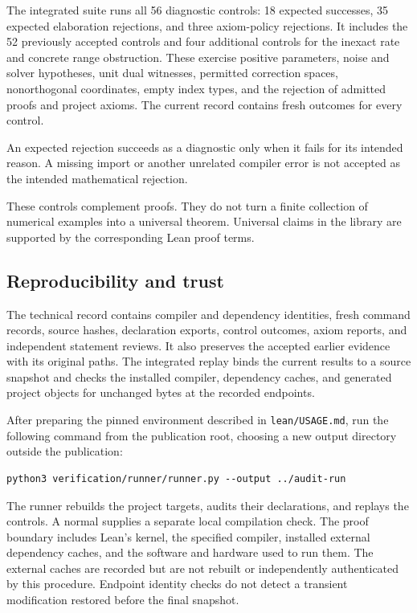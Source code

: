 \documentclass[11pt]{article}
\newcommand{\leanname}[1]{{\small\ttfamily\nolinkurl{#1}}}
\newcommand{\leanexpr}[1]{{\small\code{#1}}}
\begin{document}
The integrated suite runs all 56 diagnostic controls: 18 expected successes, 35 expected elaboration rejections, and three axiom-policy rejections. It includes the 52 previously accepted controls and four additional controls for the inexact rate and concrete range obstruction. These exercise positive parameters, noise and solver hypotheses, unit dual witnesses, permitted correction spaces, nonorthogonal coordinates, empty index types, and the rejection of admitted proofs and project axioms. The current record contains fresh outcomes for every control.

An expected rejection succeeds as a diagnostic only when it fails for its intended reason. A missing import or another unrelated compiler error is not accepted as the intended mathematical rejection.

These controls complement proofs. They do not turn a finite collection of numerical examples into a universal theorem. Universal claims in the library are supported by the corresponding Lean proof terms.

\subsection{Reproducibility and trust}
The technical record contains compiler and dependency identities, fresh command records, source hashes, declaration exports, control outcomes, axiom reports, and independent statement reviews. It also preserves the accepted earlier evidence with its original paths. The integrated replay binds the current results to a source snapshot and checks the installed compiler, dependency caches, and generated project objects for unchanged bytes at the recorded endpoints.

After preparing the pinned environment described in \leanname{lean/USAGE.md}, run the following command from the publication root, choosing a new output directory outside the publication:
\begin{verbatim}
python3 verification/runner/runner.py --output ../audit-run
\end{verbatim}
The runner rebuilds the project targets, audits their declarations, and replays the controls. A normal \leanexpr{lake build} supplies a separate local compilation check. The proof boundary includes Lean's kernel, the specified compiler, installed external dependency caches, and the software and hardware used to run them. The external caches are recorded but are not rebuilt or independently authenticated by this procedure. Endpoint identity checks do not detect a transient modification restored before the final snapshot.
\end{document}
